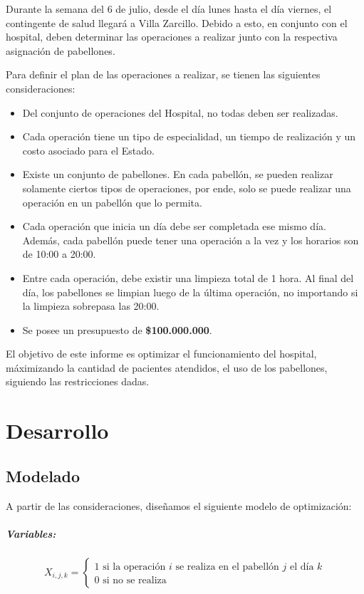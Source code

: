 \documentclass[a4paper,12pt]{book}
\begin{document}
 	Durante la semana del 6 de julio, desde el día lunes hasta el día viernes, el contingente de
 	salud llegará a Villa Zarcillo. Debido a esto, en conjunto con el hospital, deben determinar
 	las operaciones a realizar junto con la respectiva asignación de pabellones.
 	
 	Para definir el plan de las operaciones a realizar, se tienen las siguientes consideraciones:
 	\begin{itemize}
 		\item Del conjunto de operaciones del Hospital, no todas deben ser realizadas. 
 		\item Cada operación tiene un tipo de especialidad, un tiempo de realización y un costo asociado para el Estado.
 		\item Existe un conjunto de pabellones. En cada pabellón, se pueden realizar solamente ciertos tipos de operaciones, por ende, solo se puede realizar una operación en un pabellón que lo permita.
 		\item Cada operación que inicia un día debe ser completada ese mismo día. Además, cada pabellón puede tener una operación a la vez y los horarios son de 10:00 a 20:00.
 		\item Entre cada operación, debe existir una limpieza total de 1 hora. Al final del día, los pabellones se limpian luego de la última operación, no importando si la limpieza sobrepasa las 20:00.
 		\item Se posee un presupuesto de \textbf{\$100.000.000}.
 	\end{itemize}
 	
 	El objetivo de este informe es optimizar el funcionamiento del hospital, máximizando la cantidad de pacientes atendidos, el uso de los pabellones, siguiendo las restricciones dadas.
 	
 	
 	\chapter{Desarrollo}
 	\section{Modelado}
 	A partir de las consideraciones, diseñamos el siguiente modelo de optimización: 
 	\paragraph{Variables:} $$X_{i,j,k} = \begin{cases}
 		1 \text{ si la operación $i$ se realiza en el pabellón $j$ el día $k$} \\
 		0 \text{ si no se realiza}
 	\end{cases}$$
 	
\end{document}
